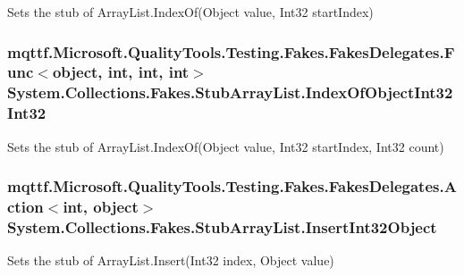 Sets the stub of Array\-List.\-Index\-Of(\-Object value, Int32 start\-Index)

\hypertarget{class_system_1_1_collections_1_1_fakes_1_1_stub_array_list_a1cccec7f46a34eed7f38d9f9b5761b90}{
\subsubsection[{Index\-Of\-Object\-Int32\-Int32}]{\setlength{\rightskip}{0pt plus 5cm}mqttf.\-Microsoft.\-Quality\-Tools.\-Testing.\-Fakes.\-Fakes\-Delegates.\-Func$<$object, int, int, int$>$ System.\-Collections.\-Fakes.\-Stub\-Array\-List.\-Index\-Of\-Object\-Int32\-Int32}}\label{class_system_1_1_collections_1_1_fakes_1_1_stub_array_list_a1cccec7f46a34eed7f38d9f9b5761b90}


Sets the stub of Array\-List.\-Index\-Of(\-Object value, Int32 start\-Index, Int32 count)

\hypertarget{class_system_1_1_collections_1_1_fakes_1_1_stub_array_list_aa183728851b0e108de162a622582adf8}{
\subsubsection[{Insert\-Int32\-Object}]{\setlength{\rightskip}{0pt plus 5cm}mqttf.\-Microsoft.\-Quality\-Tools.\-Testing.\-Fakes.\-Fakes\-Delegates.\-Action$<$int, object$>$ System.\-Collections.\-Fakes.\-Stub\-Array\-List.\-Insert\-Int32\-Object}}\label{class_system_1_1_collections_1_1_fakes_1_1_stub_array_list_aa183728851b0e108de162a622582adf8}


Sets the stub of Array\-List.\-Insert(\-Int32 index, Object value)

